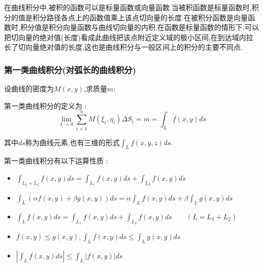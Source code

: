 \documentclass[UTF8,12pt]{ctexbook}
\newcommand{\limNormal}[1]{\lim\limits_{#1}}
\newcommand{\upDownSum}[2]{\sum\limits_{#2}^{#1}}
\newcommand{\defFunction}[1]{f(#1)}
\newcommand{\absoluteValue}[1]{\left\lvert #1 \right\vert}
\newcommand{\pathIntegral}[1]{\int_{#1}}
\begin{document}
{{{  在曲线积分中,被积的函数可以是标量函数或向量函数.当被积函数是标量函数时,积分的值是积分路径各点上的函数值乘上该点切向量的长度.在被积分函数是向量函数时,积分值是积分向量函数与曲线切向量的内积.在函数是标量函数的情形下,可以把切向量的绝对值(长度)看成此曲线把该点附近定义域的极小区间,在到达域内拉长了切向量绝对值的长度,这也是曲线积分与一般区间上的积分的主要不同点.

  \subsubsection{第一类曲线积分(对弧长的曲线积分)}{
    设曲线的密度为$M(x,y)$,求质量$m$:

    \begin{center}
    \end{center}

    第一类曲线积分的定义为 :
    $$
      \limNormal{\lambda \to 0}\upDownSum{n}{i = 1}M(\xi_i,\eta_i)\Delta S_i = m = \pathIntegral{L}\defFunction{x,y}ds
    $$

    其中$ds$称为曲线元素,也有三维的形式$\pathIntegral{L}\defFunction{x,y,z}ds$.

    第一类曲线积分有以下运算性质 :
    \begin{itemize}
      \item $\pathIntegral{L_1 + L_2}\defFunction{x,y}ds = \pathIntegral{L_1}\defFunction{x,y}ds + \pathIntegral{L_2}\defFunction{x,y}ds$
      \item $\pathIntegral{L}(\alpha\defFunction{x,y} + \beta g(x,y))ds = \alpha\pathIntegral{L}\defFunction{x,y}ds + \beta\pathIntegral{L}g(x,y)ds$
      \item $\pathIntegral{L}\defFunction{x,y}ds = \pathIntegral{L_1}\defFunction{x,y}ds + \pathIntegral{L_2}\defFunction{x,y}ds \qquad (L = L_1 + L_2)$
      \item $\defFunction{x,y} \leq g(x,y),\pathIntegral{L}\defFunction{x,y}ds \leq \pathIntegral{L}g(x,y)ds$
      \item $\absoluteValue{\pathIntegral{L}\defFunction{x,y}ds} \leq \pathIntegral{L}\absoluteValue{\defFunction{x,y}}ds$
    \end{itemize}
  }%

}}}
\end{document}
